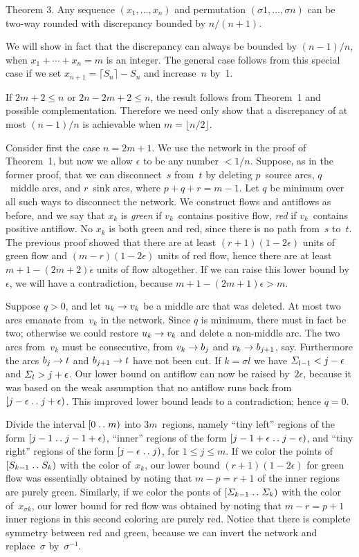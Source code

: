 \proclaim
Theorem 3. Any sequence $(x_1,\ldots,x_n)$ and permutation $(\sigma 1,\ldots,
\sigma n)$ can be two-way rounded with discrepancy bounded by $n/(n+1)$.

\proof
We will show in fact that the discrepancy can always be bounded by $(n-1)/n$,
when $x_1+\cdots +x_n=m$ is an integer. The general case follows from this
special case if we set $x_{n+1}=\lceil S_n\rceil -S_n$ and increase~$n$ by~1.

If $2m+2\leq n$ or $2n-2m+2\leq n$, the result follows from Theorem~1 and
possible complementation. Therefore we need only show that a discrepancy of at
most $(n-1)/n$ is achievable when $m=\lfloor n/2\rfloor$.

Consider first the case $n=2m+1$. We use the network in the proof of Theorem~1,
but now we allow $\epsilon$ to be any  number $< 1/n$. Suppose, as in
the former proof, that we can disconnect~$s$ from~$t$ by deleting $p$~source
arcs, $q$~middle arcs, and $r$~sink arcs,
where $p+q+r=m-1$. Let $q$ be minimum over all such ways
to disconnect the network. We construct flows and antiflows as before, and we
say that $x_k$ is {\it green\/} if $v_k$~contains positive flow, {\it red\/} if
$v_k$~contains positive antiflow. No $x_k$ is both green and red, since there
is no path from~$s$ to~$t$. The previous proof showed that there are at least
$(r+1)(1-2\epsilon)$ units of green flow and $(m-r)(1-2\epsilon)$ units of red
flow, hence there are at least $m+1-(2m+2)\epsilon$ units of flow altogether.
If we can raise this lower bound by~$\epsilon$, we will have a contradiction,
because $m+1-(2m+1)\epsilon> m$.

Suppose $q> 0$, and let $u_k\rightarrow v_k$ be a middle arc that was deleted. At
most two arcs emanate from~$v_k$ in the network. Since $q$ is minimum, there
must in fact be two; otherwise we could restore $u_k\rightarrow v_k$ and delete a
non-middle arc. The two arcs from~$v_k$ must be consecutive, from $v_k\rightarrow b_j$
and $v_k\rightarrow b_{j+1}$, say. Furthermore the arcs $b_j\rightarrow t$ and $b_{j+1}\rightarrow
t$ have not been cut. If $k=\sigma l$ we have ${\mit\Sigma}_{l-1}< j-\epsilon$
and ${\mit\Sigma}_l> j+\epsilon$. Our lower bound on antiflow can now be raised
by~$2\epsilon$, because it was based on the weak assumption that no antiflow
runs back from $[j-\epsilon\mathrel{.\,.} j+\epsilon)$. This improved lower bound leads
to a contradiction; hence $q=0$.

Divide the interval $[0\mathrel{.\,.} m)$ into $3m$~regions, namely ``tiny left'' regions
of the form $[j-1\mathrel{.\,.} j-1+\epsilon)$, ``inner'' regions of the form
$[j-1+\epsilon\mathrel{.\,.} j-\epsilon)$, and ``tiny right'' regions of the form
$[j-\epsilon\mathrel{.\,.} j)$, for $1\leq j\leq m$. If we color the points of
$[S_{k-1}\mathrel{.\,.} S_k)$ with the color of~$x_k$, our lower bound
$(r+1)(1-2\epsilon)$ for green flow was essentially obtained by noting that
$m-p=r+1$ of the inner regions are purely green. Similarly, if we color the
ponts of $[{\mit\Sigma}_{k-1}\mathrel{.\,.} {\mit\Sigma}_k)$ with the color of~$x_{\sigma k}$,
our lower bound for red flow was obtained by noting that $m-r=p+1$ inner
regions in this second coloring are purely red. Notice that there is complete
symmetry between red and green, because we can invert the network and
replace~$\sigma$ by~$\sigma^{-1}$.

